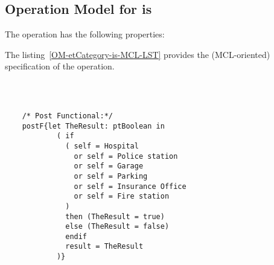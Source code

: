 \subsection{Operation Model for is}

\label{OM-is}


The  operation has the following properties:

	\begin{operationmodel}



		


	\end{operationmodel}



	\vspace{1cm}
	The listing~\ref{OM-etCategory-is-MCL-LST} provides the \msrmessir (MCL-oriented) specification of the operation.
	
	\scriptsize
	\vspace{0.5cm}
	\begin{lstlisting}[style=MessirStyle,firstnumber=auto,captionpos=b,caption={\msrmessir (MCL-oriented) specification of the operation \emph{is}.},label=OM-etCategory-is-MCL-LST]

	
	
	/* Post Functional:*/ 
	postF{let TheResult: ptBoolean in
	        ( if
	          ( self = Hospital
	            or self = Police station
	            or self = Garage
	            or self = Parking
	            or self = Insurance Office
	            or self = Fire station
	          )
	          then (TheResult = true)
	          else (TheResult = false)
	          endif
	          result = TheResult
	        )}
	
	
	\end{lstlisting}
	\normalsize 
	
	
	
	





